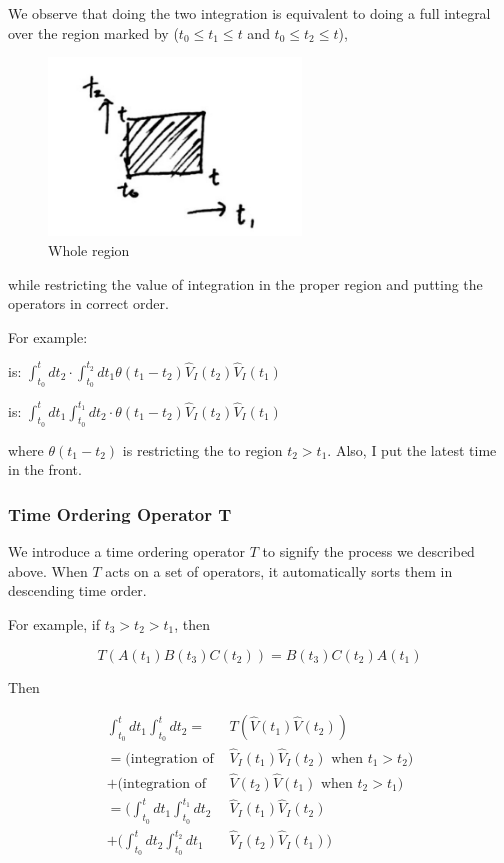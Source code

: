 \documentclass{article}
\numberwithin{equation}{subsection} %
\begin{document}
    We observe that doing the two integration is equivalent to doing a full integral over the region marked by ($t_0 \leqslant t_1 \leqslant t $ and $t_0 \leqslant t_2 \leqslant t$),

	\begin{figure}[H]
		\centering
		\includegraphics[width=0.6\textwidth]{figures/3.jpg}
		\caption{Whole region}
	\end{figure}

    while restricting the value of integration in the proper region and putting the operators in correct order.

    For example:
    
     is: $\int_{t_0}^{t}dt_2 \cdot \int_{t_0}^{t_2} dt_1 \theta(t_1-t_2) \hat{V}_I(t_2) \hat{V}_I(t_1)$
    
     is: $\int_{t_0}^{t}dt_1 \int_{t_0}^{t_1}dt_2 \cdot \theta(t_1-t_2) \hat{V}_I(t_2) \hat{V}_I(t_1)$
    
    where $\theta(t_1-t_2)$ is restricting the to region $t_2>t_1$. Also, I put the latest time in the front.
    
    \subsubsection{Time Ordering Operator T}
    
    We introduce a time ordering operator $T$ to signify the process we described above. When $T$ acts on a set of operators, it automatically sorts them in descending time order. 
    
    For example, if $t_3>t_2>t_1$, then
    
    $$T(A(t_1)B(t_3)C(t_2)) = B(t_3)C(t_2)A(t_1)$$
    
    Then
    
    \begin{align}
        \int_{t_0}^{t}dt_1 \int_{t_0}^{t}dt_2 =& T (\hat{V}(t_1) \hat{V}(t_2))
        \\
        = (\text{integration of } &\hat{V}_I(t_1) \hat{V}_I(t_2) \text{ when } t_1>t_2 ) \nonumber\\
         +(\text{integration of } &\hat{V}(t_2)\hat{V}(t_1) \text{ when } t_2>t_1)
        \nonumber\\
        = (\int_{t_0}^{t}dt_1 \int_{t_0}^{t_1}dt_2 & \hat{V}_I(t_1) \hat{V}_I(t_2)  \nonumber\\
        + (\int_{t_0}^{t}dt_2 \int_{t_0}^{t_2} dt_1 &\hat{V}_I(t_2) \hat{V}_I(t_1))
    \end{align}
    
\end{document}
